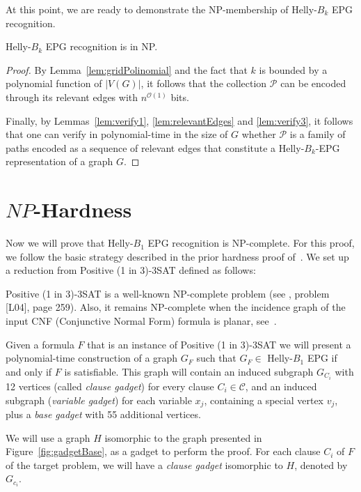 At this point, we are ready to demonstrate the NP-membership of {\sc Helly-$B_k$ EPG recognition}.

\medskip

\begin{theorem}\label{teo:nppertinencia}
{\sc Helly-$B_k$ EPG recognition} is in NP.
\end{theorem}
\begin{proof}
By Lemma~\ref{lem:gridPolinomial} and the fact that $k$ is bounded by a polynomial function of $|V(G)|$, it follows that the collection $\mathcal{P}$ can be encoded through its relevant edges with $n^{\mathcal{O}(1)}$ bits.

Finally, by Lemmas~\ref{lem:verify1}, \ref{lem:relevantEdges} and \ref{lem:verify3}, it follows that one can verify in polynomial-time in the size of $G$ whether $\mathcal{P}$ is a family of paths encoded as a sequence of relevant edges that constitute a Helly-$B_k$-EPG representation of a graph $G$.
\end{proof}

\section{$NP$-Hardness}\label{sec:sectionDispositivoClausula}

Now we will prove that  {\sc Helly-$B_1$ EPG recognition} is NP-complete. For this proof, we follow the basic strategy described in the prior hardness proof of~\cite{heldt2014}. We set up a reduction from {\sc Positive (1 in 3)-3SAT} defined  as follows:



{\sc Positive (1 in 3)-3SAT } is a well-known NP-complete problem (see \cite{johnson1979}, problem [L04], page 259). Also, it remains NP-complete when the incidence graph of the input CNF (Conjunctive Normal Form) formula is planar, see~\cite{mulzer2008minimum}.

Given a formula $F$ that is an instance of {\sc Positive (1 in 3)-3SAT} we will present a polynomial-time construction of a graph $ G_F$ such that $ G_F \in$ Helly-$B_1$ EPG if and only if $ F $ is satisfiable. This graph will contain an induced subgraph $ G_{C_i}$ with 12 vertices (called \emph {clause gadget}) for every clause $C_i \in \mathcal{C}$, and an induced subgraph (\emph {variable gadget}) for each variable $ x_j$, containing a special vertex  $ v_j$, plus a \emph{base gadget}  with 55 additional vertices.

 
We will use a graph $H$ isomorphic to the graph presented in Figure~\ref{fig:gadgetBase}, as a gadget to perform the proof. For each clause $C_i$ of $F$ of the target problem, we will have a \emph{clause gadget} isomorphic to $H$, denoted by $G_{c_i}$.

